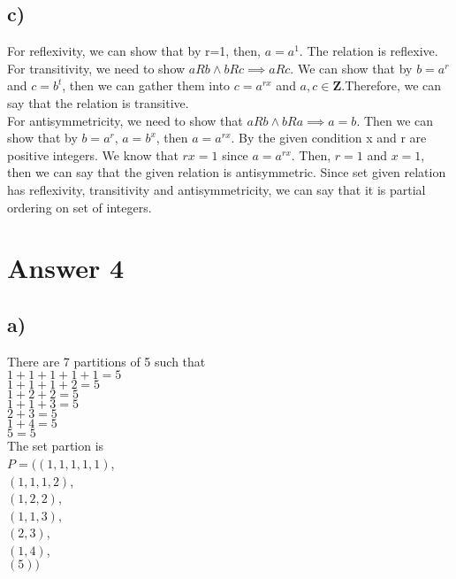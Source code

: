 \documentclass[12pt]{article}
\begin{document}
\subsection*{c)}
For reflexivity, we can show that by r=1, then, $a=a^1$. The relation is reflexive. \\
For transitivity, we need to show $aRb \land bRc \implies aRc$. We can show that by $b = a^r$ and $c = b^t$, then we can gather them into $c=a^{rx}$ and $a,c \in \textbf{Z}$.Therefore, we can say that the relation is transitive. \\
For antisymmetricity, we need to show that $aRb \land bRa \implies a=b$. Then we can show that by $b=a^r$, $a=b^x$, then $a=a^{rx}$. By the given condition x and r are positive integers. We know that $rx = 1$ since $a= a^{rx}$. Then, $r=1$ and $x=1$,  then we can say that the given relation is antisymmetric. 
Since set given relation has reflexivity, transitivity and antisymmetricity, we can say that it is partial ordering on set of integers.


\section*{Answer 4}
\subsection*{a)}
There are 7 partitions of 5 such that \\
$1+1+1+1+1  = 5$ \\
$1+1+1+2  = 5$ \\
$1+2+2 = 5$ \\
$1+1+3 = 5$ \\
$2+3 = 5$ \\
$1+4 = 5$ \\
$5 = 5$ \\

$ $\\
$ $\\
$ $\\
$ $\\
The set partion is \\
$P = (
(1,1,1,1,1)$, \\
$(1,1,1,2)$, \\
$(1,2,2)$, \\
$(1,1,3)$, \\
$(2,3)$, \\
$(1,4)$, \\
$(5) )$ \\
\end{document}
